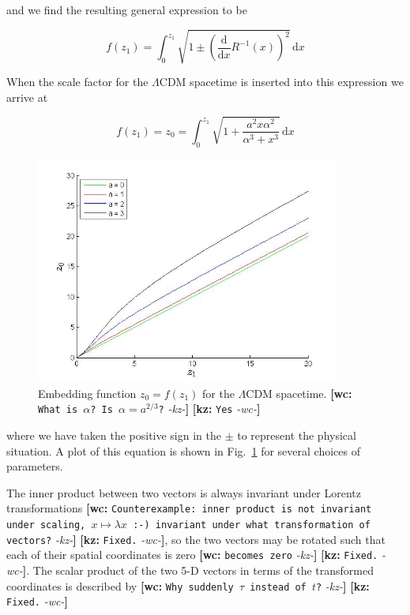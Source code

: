 \documentclass[preprint,notitlepage,amsmath,amssymb,floatfix]{revtex4-1}
\newcommand{\XXX}[3]{{\bf [#1: } {\tt #3} {\it -#2-}{\bf ]}}
\begin{document}
\noindent and we find the resulting general expression to be

\begin{equation}
f\left(z_1\right) = \int_0^{z_1}\!\sqrt{1\pm\left(\frac{\mathrm d}{\mathrm dx}R^{-1}\left(x\right)\right)^2}\,\mathrm dx
\end{equation}

\noindent When the scale factor for the $\Lambda$CDM spacetime is inserted into this expression we arrive at

\begin{equation}
f\left(z_1\right) = z_0 = \int_0^{z_1}\!\sqrt{1+\frac{a^2x\alpha^2}{\alpha^3+x^3}}\,\mathrm dx
\end{equation}

\begin{figure}
\includegraphics[width=10cm]{figures/Embedding.jpg}
\caption{Embedding function $z_0 = f\left(z_1\right)$ for the $\Lambda$CDM spacetime. \XXX{wc}{kz}{What is $\alpha$? Is $\alpha=a^{2/3}$?} \XXX{kz}{wc}{Yes}}
\label{fig:embedding}
\centering
\end{figure}

\noindent where we have taken the positive sign in the $\pm$ to represent the physical situation.  A plot of this equation is shown in Fig.~\ref{fig:embedding} for several choices of parameters. \par
The inner product between two vectors is always invariant under Lorentz transformations \XXX{wc}{kz}{Counterexample: inner product is not invariant under scaling, $x\mapsto\lambda x$ :-) invariant under what transformation of vectors?} \XXX{kz}{wc}{Fixed.}, so the two vectors may be rotated such that each of their spatial coordinates is zero \XXX{wc}{kz}{becomes zero} \XXX{kz}{wc}{Fixed.}.  
The scalar product of the two 5-D vectors in terms of the transformed coordinates is described by \XXX{wc}{kz}{Why suddenly $\tau$ instead of $t$?} \XXX{kz}{wc}{Fixed.}
\end{document}
